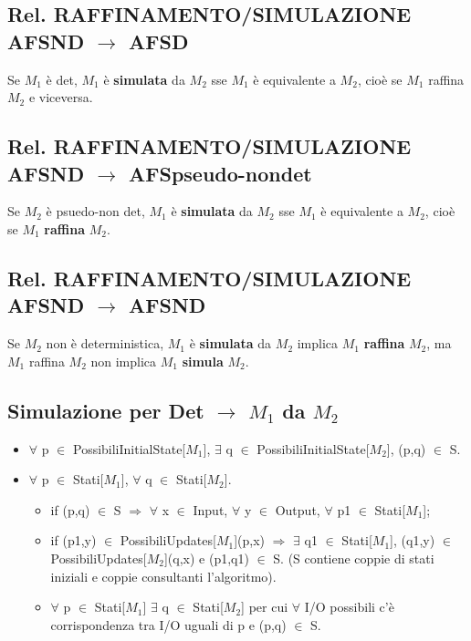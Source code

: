 \documentclass[a4paper]{article}
\begin{document}
\subsection{Rel. RAFFINAMENTO/SIMULAZIONE AFSND $\rightarrow$ AFSD} Se $M_1$ è det, $M_1$ è \textbf{simulata} da $M_2$ sse $M_1$ è equivalente a $M_2$, cioè se $M_1$ raffina $M_2$ e viceversa.
\subsection{Rel. RAFFINAMENTO/SIMULAZIONE AFSND $\rightarrow$ AFSpseudo-nondet} Se $M_2$ è psuedo-non det, $M_1$ è \textbf{simulata} da $M_2$ sse $M_1$ è equivalente a $M_2$, cioè se $M_1$ \textbf{raffina} $M_2$.
\subsection{Rel. RAFFINAMENTO/SIMULAZIONE AFSND $\rightarrow$ AFSND} Se $M_2$ non è deterministica, $M_1$ è \textbf{simulata} da $M_2$ implica $M_1$ \textbf{raffina} $M_2$, ma $M_1$ raffina $M_2$ non implica $M_1$ \textbf{simula} $M_2$.
\subsection{Simulazione per Det $\rightarrow$ $M_1$ da $M_2$}
\begin{itemize}
\item $\forall$ p $\in$  PossibiliInitialState[$M_1$], $\exists$ q $\in$ PossibiliInitialState[$M_2$], (p,q) $\in$ S.
\item $\forall$ p $\in$  Stati[$M_1$], $\forall$ q $\in$ Stati[$M_2$].
\begin{itemize}
\item if (p,q) $\in$ S $\Rightarrow$ $\forall$ x $\in$ Input, $\forall$ y $\in$ Output, $\forall$ p1 $\in$  Stati[$M_1$];
\item if (p1,y) $\in$ PossibiliUpdates[$M_1$](p,x) $\Rightarrow$ $\exists$ q1 $\in$ Stati[$M_1$], (q1,y) $\in$ PossibiliUpdates[$M_2$](q,x) e (p1,q1) $\in$ S. (S contiene coppie di stati iniziali e coppie consultanti l'algoritmo).
\item $\forall$ p $\in$ Stati[$M_1$] $\exists$ q $\in$ Stati[$M_2$] per cui $\forall$ I/O possibili c'è corrispondenza tra I/O uguali di p e (p,q) $\in$ S. 
\end{itemize}
\end{itemize}
\end{document}
